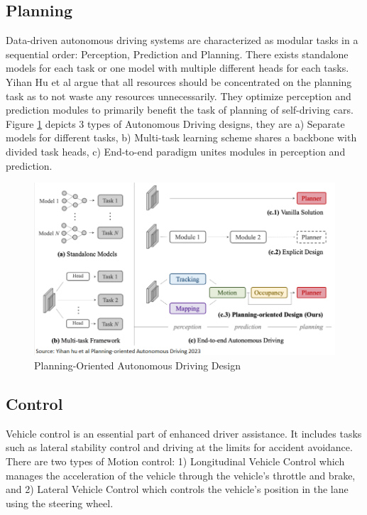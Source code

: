\begin{spacing}{1.5}
\begin{sloppypar}
\subsection{Planning}

Data-driven autonomous driving systems are characterized as modular tasks in a sequential order: Perception, Prediction and Planning. There exists standalone models for each task or one model with multiple different heads for each tasks. Yihan Hu et al \cite{hu2023planning} argue that all resources should be concentrated on the planning task as to not waste any resources unnecessarily. They optimize perception and prediction modules to primarily benefit the task of planning of self-driving cars. Figure \ref{fig:planning} depicts 3 types of Autonomous Driving designs, they are a) Separate models for different tasks, b) Multi-task learning scheme shares a backbone with divided task heads, c) End-to-end paradigm unites modules in perception and prediction.

\begin{figure}[h]
\begin{center}
\includegraphics[scale=0.7]{2/hu2023Planning.png}
\caption{Planning-Oriented Autonomous Driving Design}
\label{fig:planning}
\end{center}
\end{figure}

 

\subsection{Control}
Vehicle control is an essential part of enhanced driver assistance. It includes tasks such as lateral stability control and driving at the limits for accident avoidance. There are two types of Motion control: 1) Longitudinal Vehicle Control which manages the acceleration of the vehicle through the vehicle's throttle and brake, and 2) Lateral Vehicle Control which controls the vehicle's position in the lane using the steering wheel. 


\end{sloppypar}
\end{spacing}
